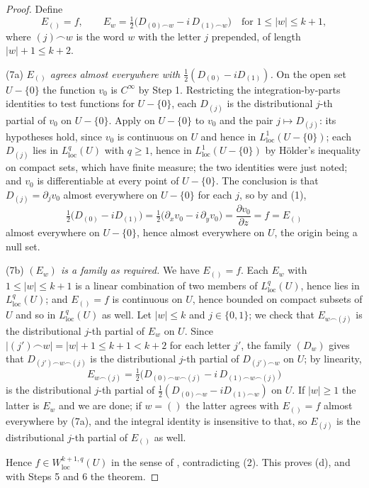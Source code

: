 \begin{proof}
Define
\[
  E_{()}=f,\qquad
  E_w=\tfrac12\bigl(D_{(0)\frown w}-i\,D_{(1)\frown w}\bigr)
  \quad\text{for }1\le|w|\le k+1,
\]
where $(j)\frown w$ is the word $w$ with the letter $j$ prepended, of length
$|w|+1\le k+2$.

\noindent(7a) \emph{$E_{()}$ agrees almost everywhere with
$\tfrac12(D_{(0)}-iD_{(1)})$.}  On the open set $U-\{0\}$ the function $v_0$ is
$C^\infty$ by Step 1.  Restricting the integration-by-parts identities to test
functions for $U-\{0\}$, each $D_{(j)}$ is the distributional $j$-th partial of
$v_0$ on $U-\{0\}$.  Apply  on $U-\{0\}$ to
$v_0$ and the pair $j\mapsto D_{(j)}$: its hypotheses hold, since $v_0$ is
continuous on $U$ and hence in $L^1_{\mathrm{loc}}(U-\{0\})$; each $D_{(j)}$
lies in $L^{q}_{\mathrm{loc}}(U)$ with $q\ge1$, hence in
$L^1_{\mathrm{loc}}(U-\{0\})$ by Hölder's inequality on compact sets, which
have finite measure; the two identities were just noted; and $v_0$ is
differentiable at every point of $U-\{0\}$.  The conclusion is that
$D_{(j)}=\partial_jv_0$ almost everywhere on $U-\{0\}$ for each $j$, so by
 and (1),
\[
  \tfrac12\bigl(D_{(0)}-iD_{(1)}\bigr)
  =\tfrac12\bigl(\partial_xv_0-i\,\partial_yv_0\bigr)
  =\frac{\partial v_0}{\partial z}=f=E_{()}
\]
almost everywhere on $U-\{0\}$, hence almost everywhere on $U$, the origin
being a null set.

\noindent(7b) \emph{$(E_w)$ is a family as required.}  We have $E_{()}=f$.  Each
$E_w$ with $1\le|w|\le k+1$ is a linear combination of two members of
$L^{q}_{\mathrm{loc}}(U)$, hence lies in $L^{q}_{\mathrm{loc}}(U)$; and
$E_{()}=f$ is continuous on $U$, hence bounded on compact subsets of $U$ and so
in $L^{q}_{\mathrm{loc}}(U)$ as well.  Let $|w|\le k$ and $j\in\{0,1\}$; we
check that $E_{w\frown(j)}$ is the distributional $j$-th partial of $E_w$ on
$U$.  Since $|(j')\frown w|=|w|+1\le k+1<k+2$ for each letter $j'$, the family
$(D_w)$ gives that $D_{(j')\frown w\frown(j)}$ is the distributional $j$-th
partial of $D_{(j')\frown w}$ on $U$; by linearity, 
\[
  E_{w\frown(j)}
  =\tfrac12\bigl(D_{(0)\frown w\frown(j)}-i\,D_{(1)\frown w\frown(j)}\bigr)
\]
is the distributional $j$-th partial of
$\tfrac12(D_{(0)\frown w}-iD_{(1)\frown w})$ on $U$.  If $|w|\ge1$ the latter is
$E_w$ and we are done; if $w=()$ the latter agrees with $E_{()}=f$ almost
everywhere by (7a), and the integral identity is insensitive to that, so
$E_{(j)}$ is the distributional $j$-th partial of $E_{()}$ as well.

Hence $f\in W^{k+1,q}_{\mathrm{loc}}(U)$ in the sense of ,
contradicting (2).  This proves (d), and with Steps 5 and 6 the theorem.
\end{proof}
